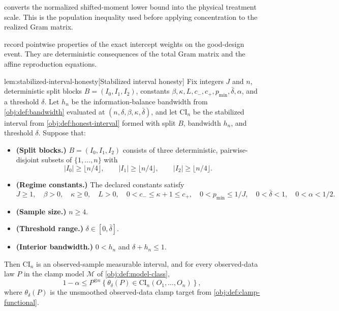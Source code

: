 \documentclass[11pt]{article}
\begin{document}
 converts the normalized shifted-moment lower bound into the physical treatment scale. This is the population inequality used before applying concentration to the realized Gram matrix.

 record pointwise properties of the exact intercept weights on the good-design event. They are deterministic consequences of the total Gram matrix and the affine reproduction equations.

\begin{lemmav}{lem:stabilized-interval-honesty}[Stabilized interval honesty]
Fix integers \(J\) and \(n\), deterministic split blocks \(B=(I_0,I_1,I_2)\), constants \(\beta,\kappa,L,c_-,c_+,p_{\min},\bar\delta,\alpha\), and a threshold \(\delta\).  Let \(h_n\) be the information-balance bandwidth from \cref{obj:def:bandwidth} evaluated at \((n,\delta,\beta,\kappa,\bar\delta)\), and let \(\mathrm{CI}_n\) be the stabilized interval from \cref{obj:def:honest-interval} formed with split \(B\), bandwidth \(h_n\), and threshold \(\delta\).  Suppose that:
\begin{itemize}
\item \textbf{(Split blocks.)} \(B=(I_0,I_1,I_2)\) consists of three deterministic, pairwise-disjoint subsets of \(\{1,\ldots,n\}\) with
\[
|I_0|\ge \lfloor n/4\rfloor,\qquad
|I_1|\ge \lfloor n/4\rfloor,\qquad
|I_2|\ge \lfloor n/4\rfloor .
\]
\item \textbf{(Regime constants.)} The declared constants satisfy
\[
J\ge 1,\quad
\beta>0,\quad
\kappa\ge 0,\quad
L>0,\quad
0<c_-\le \kappa+1\le c_+,\quad
0<p_{\min}\le 1/J,\quad
0<\bar\delta<1,\quad
0<\alpha<1/2 .
\]
\item \textbf{(Sample size.)} \(n\ge 4\).
\item \textbf{(Threshold range.)} \(\delta\in[0,\bar\delta]\).
\item \textbf{(Interior bandwidth.)} \(0<h_n\) and \(\delta+h_n\le 1\).
\end{itemize}
Then \(\mathrm{CI}_n\) is an observed-sample measurable interval, and for every observed-data law \(P\) in the clamp model \(\mathcal M\) of \cref{obj:def:model-class},
\[
1-\alpha
\le
P^{\otimes n}\!\left\{
\theta_\delta(P)\in \mathrm{CI}_n(O_1,\ldots,O_n)
\right\},
\]
where \(\theta_\delta(P)\) is the unsmoothed observed-data clamp target from \cref{obj:def:clamp-functional}.
\end{lemmav}
\end{document}
